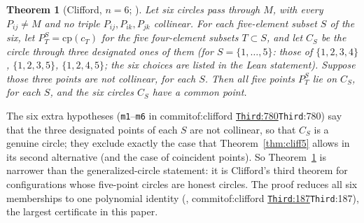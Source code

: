 \documentclass[11pt]{article}
\newtheorem{theorem}{Theorem}
\theoremstyle{definition}
\theoremstyle{remark}
\newcommand{\lean}[1]{\texttt{#1}}
\newcommand{\commitof}[1]{\csname commitof:#1\endcsname}
\newcommand{\repo}[1]{https://github.com/jpbald93/#1}
\newcommand{\src}[4]{\ifcsname commitof:#1\endcsname
  \href{\repo{#1}/blob/\commitof{#1}/#2/#3.lean\#L#4}{\texttt{#3}:#4}\else\texttt{#3}:#4\fi}
\begin{document}
\begin{theorem}[Clifford, $n=6$; ]\label{thm:cliff6}
Let six circles pass through $M$, with every $P_{ij}\neq M$ and no triple $P_{ij},P_{ik},P_{jk}$
collinear. For each five-element subset $S$ of the six, let $P^S_T=\mathrm{cp}(c_T)$ for the five
four-element subsets $T\subset S$, and let $C_S$ be the circle through three designated ones of them
(for $S=\{1,\dots,5\}$: those of $\{1,2,3,4\}$, $\{1,2,3,5\}$, $\{1,2,4,5\}$; the six choices are listed
in the Lean statement). Suppose those three points are not collinear, for each $S$. Then all five
points $P^S_T$ lie on $C_S$, for each $S$, and the six circles $C_S$ have a common point.
\end{theorem}

The six extra hypotheses (\lean{m1}--\lean{m6} in \src{clifford}{Clifford}{Third}{780}) say that the
three designated points of each $S$ are not collinear, so that $C_S$ is a genuine circle; they exclude
exactly the case that Theorem~\ref{thm:cliff5} allows in its second alternative (and the case of
coincident points). So Theorem~\ref{thm:cliff6} is narrower than the
generalized-circle statement: it is Clifford's third theorem for configurations whose five-point
circles are honest circles. The proof reduces all six memberships to one polynomial identity
(, \src{clifford}{Clifford}{Third}{187}), the largest certificate in this paper.
\end{document}
